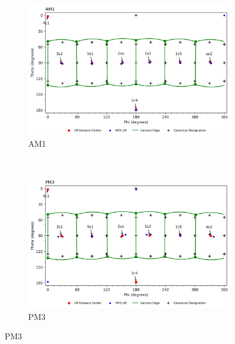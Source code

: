 \documentclass{article}
\begin{document}
\begin{figure}[H]\ContinuedFloat
	\centering
   	\begin{subfigure}[b]{0.49\textwidth}
   	\includegraphics[width=1\textwidth,keepaspectratio]
   	{figures/oxane/overall/z_dataset-oxane-LM-AM1-all_groupings.png}
   	\caption{AM1}
	\end{subfigure}
	~
	\begin{subfigure}[b]{0.49\textwidth}
	\includegraphics[width=1\textwidth,keepaspectratio]
   	{figures/oxane/overall/z_dataset-oxane-LM-PM3-all_groupings.png}
	\caption{PM3}
	\end{subfigure}
\end{figure}
\end{document}
